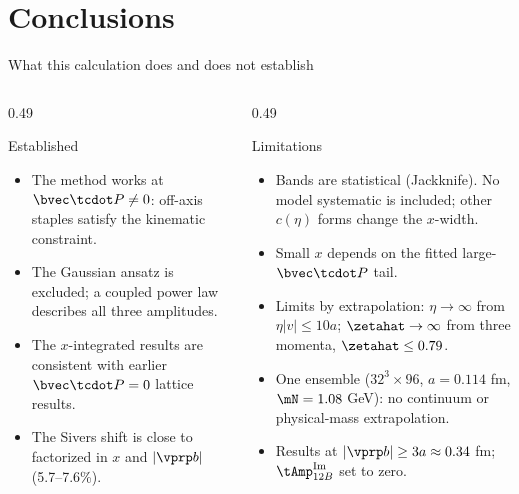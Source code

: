 \section{Conclusions}

\begin{frame}{What this calculation does and does not establish}
  \begin{columns}[t]
    \begin{column}{0.49\textwidth}
      \begin{block}{Established}
        \begin{itemize}
          \item The method works at $\bvec\tcdot P\neq0$: off-axis staples satisfy the kinematic constraint.
          \item The Gaussian ansatz is excluded; a coupled power law describes all three amplitudes.
          \item The $x$-integrated results are consistent with earlier $\bvec\tcdot P=0$ lattice results.
          \item The Sivers shift is close to factorized in $x$ and $|\vprp b|$ (5.7--7.6\%).
        \end{itemize}
      \end{block}
    \end{column}
    \begin{column}{0.49\textwidth}
      \begin{alertblock}{Limitations}
        \begin{itemize}
          \item Bands are statistical (Jackknife). No model systematic is included; other $c(\eta)$ forms change the $x$-width.
          \item Small $x$ depends on the fitted large-$\bvec\tcdot P$ tail.
          \item Limits by extrapolation: $\eta\to\infty$ from $\eta|v|\le10a$; $\zetahat\to\infty$ from three momenta, $\zetahat\le0.79$.
          \item One ensemble ($32^3\times96$, $a=0.114$ fm, $\mN=1.08$ GeV): no continuum or physical-mass extrapolation.
          \item Results at $|\vprp b|\ge 3a\approx0.34$ fm; $\tAmp_{12B}^{\text{Im}}$ set to zero.
        \end{itemize}
      \end{alertblock}
    \end{column}
  \end{columns}
\end{frame}

